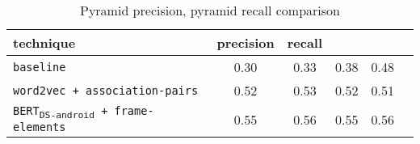 \begin{table}[H]
\centering    
\begin{small}
\begin{threeparttable}
\begin{tabular}{lccccc}


\textbf{technique} & 
\textbf{precision} & \textbf{recall}  \\


\hline


\texttt{baseline} &
0.30 & 0.33 &  
0.38 & 0.48 
\\

\texttt{word2vec + association-pairs} &
0.52 & 0.53 &  
0.52 & 0.51
\\


\texttt{BERT\textsubscript{DS-android} + frame-elements} &
0.55 & 0.56 & 
0.55 & 0.56 
\\

\hline

\end{tabular}
\end{threeparttable}
\end{small}
\caption{Pyramid precision, pyramid recall comparison}
\label{tbl:approach-results-overall}
\end{table}

